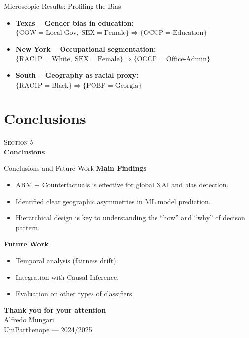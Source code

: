 \documentclass[10pt,aspectratio=169]{beamer}
\begin{document}
\begin{frame}{Microscopic Results: Profiling the Bias}
  \begin{itemize}\setlength{\itemsep}{10pt}
    \item \textbf{Texas -- Gender bias in education:}\\
      \quad $\{\mathrm{COW{=}Local\text{-}Gov},\ \mathrm{SEX{=}Female}\} \Rightarrow \{\mathrm{OCCP{=}Education}\}$
    \item \textbf{New York -- Occupational segmentation:}\\
      \quad $\{\mathrm{RAC1P{=}White},\ \mathrm{SEX{=}Female}\} \Rightarrow \{\mathrm{OCCP{=}Office\text{-}Admin}\}$
    \item \textbf{South -- Geography as racial proxy:}\\
      \quad $\{\mathrm{RAC1P{=}Black}\} \Rightarrow \{\mathrm{POBP{=}Georgia}\}$
  \end{itemize}
\end{frame}

\section{Conclusions}

{
\begin{frame}[plain]
  \centering
  \vfill
  {\color{parthenopeblue}\large\textsc{Section 5}}\\[10pt]
  {\color{parthenopenavy}\Huge\bfseries Conclusions}
  \vfill
\end{frame}}

\begin{frame}{Conclusions and Future Work}
  \textbf{Main Findings}
  \begin{itemize}
    \item ARM + Counterfactuals is effective for global XAI and bias detection.
    \item Identified clear geographic asymmetries in ML model prediction.
    \item Hierarchical design is key to understanding the ``how'' and ``why'' of decison pattern.
  \end{itemize}
  \bigskip
  \textbf{Future Work}
  \begin{itemize}
    \item Temporal analysis (fairness drift).
    \item Integration with Causal Inference.
    \item Evaluation on other types of classifiers.
  \end{itemize}
\end{frame}

{
\begin{frame}[plain]
  \centering
  \vfill
  {\color{parthenopenavy}\Huge\bfseries Thank you for your attention}\\[20pt]
  {\color{parthenopeblue}\large Alfredo Mungari}\\[4pt]
  {\color{parthenopeblue}\normalsize UniParthenope --- 2024/2025}
  \vfill
\end{frame}}
\end{document}
